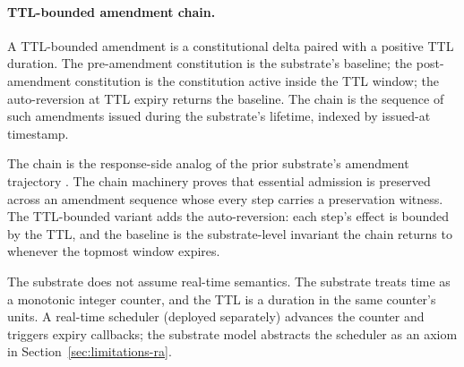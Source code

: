 \paragraph{TTL-bounded amendment chain.}
A TTL-bounded amendment is a constitutional delta paired with a
positive TTL duration. The pre-amendment constitution is the
substrate's baseline; the post-amendment constitution is the
constitution active inside the TTL window; the auto-reversion at TTL
expiry returns the baseline. The chain is the sequence of such
amendments issued during the substrate's lifetime, indexed by
issued-at timestamp.

The chain is the response-side analog of the prior substrate's
amendment trajectory \cite{programmableSovereigntyAnonymous}. The chain
machinery  proves that essential
admission is preserved across an amendment sequence whose every step
carries a preservation witness. The TTL-bounded variant adds the auto-reversion:
each step's effect is bounded by the TTL, and the baseline is the
substrate-level invariant the chain returns to whenever the topmost
window expires.

The substrate does not assume real-time semantics. The substrate
treats time as a monotonic integer counter, and the TTL is a duration
in the same counter's units. A real-time scheduler (deployed
separately) advances the counter and triggers expiry callbacks; the
substrate model abstracts the scheduler as an axiom in
Section~\ref{sec:limitations-ra}.
